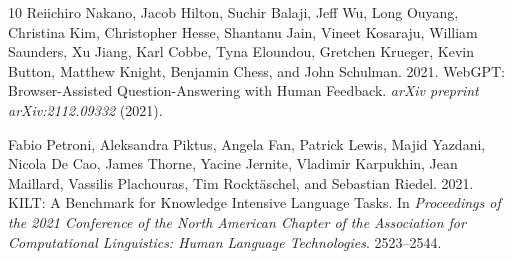 \begin{thebibliography}{10}
Reiichiro Nakano, Jacob Hilton, Suchir Balaji, Jeff Wu, Long Ouyang,
Christina Kim, Christopher Hesse, Shantanu Jain, Vineet Kosaraju,
William Saunders, Xu Jiang, Karl Cobbe, Tyna Eloundou, Gretchen Krueger,
Kevin Button, Matthew Knight, Benjamin Chess, and John Schulman. 2021.
WebGPT: Browser-Assisted Question-Answering with Human Feedback.
\emph{arXiv preprint arXiv:2112.09332} (2021).

Fabio Petroni, Aleksandra Piktus, Angela Fan, Patrick Lewis, Majid Yazdani,
Nicola De Cao, James Thorne, Yacine Jernite, Vladimir Karpukhin,
Jean Maillard, Vassilis Plachouras, Tim Rockt\"aschel, and Sebastian Riedel.
2021.
KILT: A Benchmark for Knowledge Intensive Language Tasks.
In \emph{Proceedings of the 2021 Conference of the North American Chapter of
the Association for Computational Linguistics: Human Language Technologies}.
2523--2544.

\end{thebibliography}
